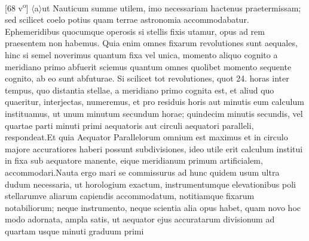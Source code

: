 [68 v\textsuperscript{o}] $\langle$a$\rangle$ut Nauticum summe utilem, imo necessariam hactenus praetermissam; sed scilicet coelo potius quam terrae astronomia accommodabatur. Ephemeridibus\protect{} quocumque operosis si stellis fixis\protect{} utamur, opus ad rem praesentem non habemus. Quia enim omnes fixarum\protect{} revolutiones sunt aequales, hinc si semel noverimus quantum fixa\protect{} vel unica, momento aliquo cognito a meridiano\protect{} primo abfuerit sciemus quantum omnes quolibet momento sequente cognito, ab eo sunt abfuturae. Si scilicet tot revolutiones, quot 24. horas inter tempus, quo distantia stellae\protect{}, a meridiano \protect{} primo cognita est, et aliud quo quaeritur,  interjectas, numeremus, et pro residuis horis aut minutis eum calculum instituamus, ut unum minutum secundum horae; quindecim minutis secundis, vel quartae parti minuti primi aequatoris\protect{} aut circuli aequatori\protect{} paralleli, respondeat.\pend \pstart Et quia Aequator\protect{} Parallelorum\protect{} omnium est maximus et in circulo majore accuratiores haberi possunt subdivisiones, ideo utile erit calculum institui in fixa sub aequatore\protect{} manente, eique meridianum\protect{}  primum artificialem, accommodari.\pend \pstart Nauta ergo mari se commissurus ad hunc quidem usum ultra dudum necessaria, ut horologium\protect{} exactum, instrumentumque elevationibus poli\protect{} stellarumve\protect{} aliarum capiendis accommodatum, notitiamque fixarum\protect{} notabiliorum; neque instrumento, neque scientia alia opus habet, quam   novo hoc modo adornata,  ampla satis, ut aequator\protect{} ejus accuratarum divisionum\hspace{1pt}  ad\hspace{1pt}  quartam\hspace{1pt}  usque\hspace{1pt}  minuti\hspace{1pt}  graduum\hspace{1pt}  primi\hspace{1pt}  